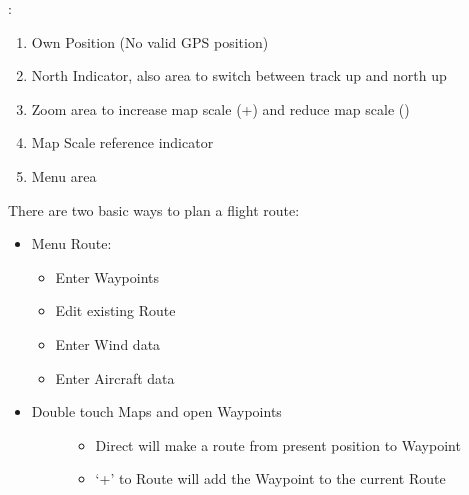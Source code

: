 \documentclass[letterpaper,10pt,english]{sphinxmanual}
\begin{document}
\begin{figure}[htbp]
\centering

\noindent{}
\end{figure}

\sphinxAtStartPar
{}:
\begin{enumerate}
%
\item {} 
\sphinxAtStartPar
Own Position (No valid GPS position)

\item {} 
\sphinxAtStartPar
North Indicator, also area to switch between track up and north up

\item {} 
\sphinxAtStartPar
Zoom area to increase map scale (+) and reduce map scale (\sphinxhyphen{})

\item {} 
\sphinxAtStartPar
Map Scale reference indicator

\item {} 
\sphinxAtStartPar
Menu area

\end{enumerate}

\sphinxAtStartPar
There are two basic ways to plan a flight route:
\begin{itemize}
\item {} 
\sphinxAtStartPar
Menu \sphinxhyphen{} Route:
\begin{itemize}
\item {} 
\sphinxAtStartPar
Enter Waypoints

\item {} 
\sphinxAtStartPar
Edit existing Route

\item {} 
\sphinxAtStartPar
Enter Wind data

\item {} 
\sphinxAtStartPar
Enter Aircraft data

\end{itemize}

\item {} \begin{description}
\item[{Double touch Maps and open Waypoints}] \leavevmode\begin{itemize}
\item {} 
\sphinxAtStartPar
Direct will make a route from present position to Waypoint

\item {} 
\sphinxAtStartPar
‘+’ to Route will add the Waypoint to the current Route

\end{itemize}

\end{description}

\end{itemize}
\end{document}
